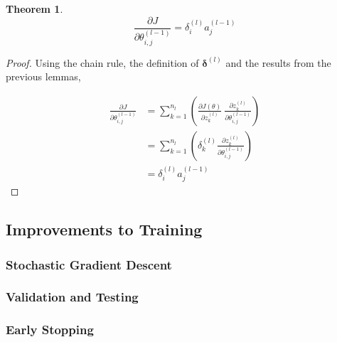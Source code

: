 \documentclass{article}[11pt]
\newtheorem{theorem}{Theorem}
\begin{document}
        
        
        
        \begin{theorem}
            
            $$
            \frac{\partial J}{\partial \theta^{(l-1)}_{i,j}} = \delta^{(l)}_i a^{(l-1)}_j
            $$
            
        \end{theorem}
        
        \begin{proof}
        
            Using the chain rule, the definition of $\boldsymbol{\delta}^{(l)}$ and the results from the previous lemmas,
            
            $$ \begin{aligned}
            \frac{\partial J}{\partial \theta^{(l-1)}_{i,j}}
            &= \sum_{k=1}^{n_l} \left( \frac{\partial J(\theta)}{\partial z^{(l)}_k} \ \frac{\partial z^{(l)}_k}{\partial \theta^{(l-1)}_{i,j}} \right) \\
            &= \sum_{k=1}^{n_l} \left( \delta^{(l)}_k \frac{\partial z^{(l)}_k}{\partial \theta^{(l-1)}_{i,j}} \right) \\
            &= \delta^{(l)}_i a^{(l-1)}_j
            \end{aligned}$$
        
        \end{proof}
        
        



    \subsection{Improvements to Training}
        
        
        \subsubsection{Stochastic Gradient Descent}
        
        \subsubsection{Validation and Testing}



        \subsubsection{Early Stopping}
\end{document}
